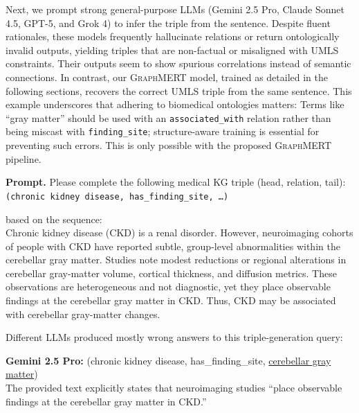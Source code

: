 \documentclass[10pt]{article}
\newcommand{\ours}{\textsc{GraphMERT}\xspace}
\begin{document}
Next, we prompt strong general-purpose LLMs (Gemini 2.5 Pro, Claude Sonnet 4.5, GPT-5, and Grok 4) to infer the triple from the sentence. Despite fluent rationales, these models frequently hallucinate relations or return ontologically invalid outputs, yielding triples that are non-factual or misaligned with UMLS constraints. Their outputs seem to show spurious correlations instead of semantic connections. In contrast, our \ours model, trained as detailed in the following sections, recovers the correct UMLS triple from the same sentence. This example underscores that adhering to biomedical ontologies matters: Terms like “gray matter” should be used with an \texttt{associated\_with} relation rather than being miscast with \texttt{finding\_site}; structure-aware training is essential for preventing such errors. This is only possible with the proposed \ours pipeline.


\begin{tcolorbox}[enhanced,breakable,colback=gray!5,colframe=gray!40,
                  left=6pt,right=6pt,top=6pt,bottom=6pt,boxsep=0pt]
\noindent\textbf{Prompt.} Please complete the following medical KG triple (head, relation, tail):\\
\texttt{(chronic kidney disease, has\_finding\_site, \ldots)}

\vspace{\baselineskip}
based on the sequence:\\[0.5em]
Chronic kidney disease (CKD) is a renal disorder. However, neuroimaging cohorts of people with CKD have reported subtle, group-level abnormalities within the cerebellar gray matter. Studies note modest reductions or regional alterations in cerebellar gray-matter volume, cortical thickness, and diffusion metrics. These observations are heterogeneous and not diagnostic, yet they place observable findings at the cerebellar gray matter in CKD. Thus, CKD may be associated with cerebellar gray-matter changes.
\end{tcolorbox}

\noindent
Different LLMs produced mostly wrong answers to this triple-generation query:

\begin{tcolorbox}[enhanced,breakable,colback=gray!5,colframe=gray!40,
                  left=6pt,right=6pt,top=6pt,bottom=6pt,boxsep=0pt]
\noindent\textbf{Gemini 2.5 Pro: }{\small
(chronic kidney disease, has\_finding\_site, \underline{cerebellar gray matter})\\

The provided text explicitly states that neuroimaging studies ``place observable findings at the cerebellar gray matter in CKD.''
}
\end{tcolorbox}
\end{document}
